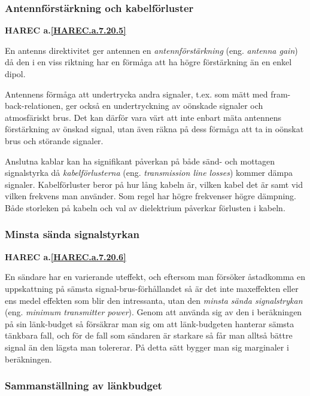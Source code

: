 \subsubsection{Antennförstärkning och kabelförluster}
\textbf{HAREC a.\ref{HAREC.a.7.20.5}\label{myHAREC.a.7.20.5}}

En antenns direktivitet ger antennen en \emph{antennförstärkning} (eng.
\emph{antenna gain}) då den i en viss riktning har en förmåga att ha högre
förstärkning än en enkel dipol.

Antennens förmåga att undertrycka andra signaler, t.ex. som mätt med
fram-back-relationen, ger också en undertryckning av oönskade signaler och
atmosfäriskt brus.
Det kan därför vara värt att inte enbart mäta antennens förstärkning av
önskad signal, utan även räkna på dess förmåga att ta in oönskat brus och
störande signaler.

Anslutna kablar kan ha signifikant påverkan på både sänd- och mottagen
signalstyrka då \emph{kabelförlusterna} (eng. \emph{transmission line losses})
kommer dämpa signaler.
Kabelförluster beror på hur lång kabeln är, vilken kabel det är samt vid
vilken frekvens man använder.
Som regel har högre frekvenser högre dämpning.
Både storleken på kabeln och val av dielektrium påverkar förlusten i kabeln.


\subsubsection{Minsta sända signalstyrkan}
\textbf{HAREC a.\ref{HAREC.a.7.20.6}\label{myHAREC.a.7.20.6}}

En sändare har en varierande uteffekt, och eftersom man försöker åstadkomma en
uppskattning på sämsta signal-brus-förhållandet så är det inte maxeffekten
eller ens medel effekten som blir den intressanta, utan den \emph{minsta sända
signalstrykan} (eng. \emph{minimum transmitter power}).
Genom att använda sig av den i beräkningen på sin länk-budget så försäkrar man
sig om att länk-budgeten hanterar sämsta tänkbara fall, och för de fall som
sändaren är starkare så får man alltså bättre signal än den lägsta man
tolererar.
På detta sätt bygger man sig marginaler i beräkningen.

\subsubsection{Sammanställning av länkbudget}

